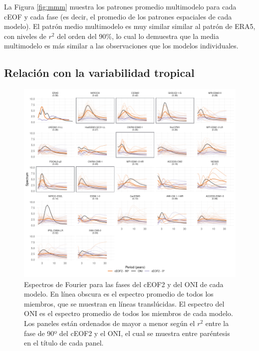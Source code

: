 \documentclass[12pt,oneside]{reedthesis}
\begin{document}
La Figura \ref{fig:mmm} muestra los patrones promedio multimodelo para cada cEOF y cada fase (es decir, el promedio de los patrones espaciales de cada modelo).
El patrón medio multimodelo es muy similar similar al patrón de ERA5, con niveles de \(r^2\) del orden del 90\%, lo cual lo demuestra que la media multimodelo es más similar a las observaciones que los modelos individuales.

\hypertarget{relaciuxf3n-con-la-variabilidad-tropical}{%
\subsection{Relación con la variabilidad tropical}\label{relaciuxf3n-con-la-variabilidad-tropical}}

\begin{figure}
\includegraphics{figures/50-cmip6/fft-ceof2-1} \caption{Espectros de Fourier para las fases del cEOF2 y del ONI de cada modelo. En línea obscura es el espectro promedio de todos los miembros, que se muestran en líneas translúcidas. El espectro del ONI es el espectro promedio de todos los miembros de cada modelo. Los paneles están ordenados de mayor a menor según el \(r^2\) entre la fase de 90º del cEOF2 y el ONI, el cual se muestra entre paréntesis en el título de cada panel.}\label{fig:fft-ceof2}
\end{figure}
\end{document}
